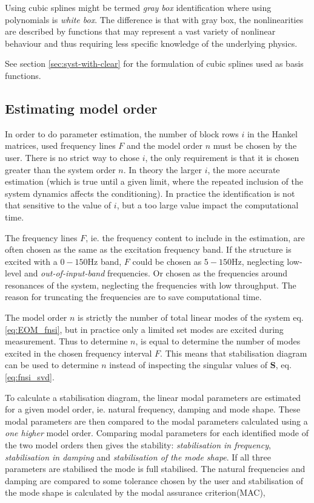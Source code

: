 Using cubic splines might be termed \textit{gray box} identification where using
polynomials is \textit{white box}. The difference is that with gray box, the
nonlinearities are described by functions that may represent a vast variety of
nonlinear behaviour and thus requiring less specific knowledge of the underlying
physics.

See section \ref{sec:syst-with-clear} for the formulation of cubic splines used
as basis functions.

\subsection{Estimating model order}

In order to do parameter estimation, the number of block rows $i$ in the Hankel
matrices, used frequency lines $F$ and the model order $n$ must be chosen by the
user.
There is no strict way to chose $i$, the only requirement is that it is chosen
greater than the system order $n$. In theory the larger $i$, the more accurate
estimation (which is true until a given limit, where the repeated inclusion of
the system dynamics affects the conditioning). In practice the identification is
not that sensitive to the value of $i$, but a too large value impact the
computational time.

The frequency lines $F$, ie. the frequency content to include in the estimation,
are often chosen as the same as the excitation frequency band. If the structure
is excited with a $0-150$Hz band, $F$ could be chosen as $5-150$Hz, neglecting
low-level and \textit{out-of-input-band} frequencies. Or chosen as the
frequencies around resonances of the system, neglecting the frequencies with low
throughput. The reason for truncating the frequencies are to save computational
time.

The model order $n$ is strictly the number of total linear modes of the system
eq. \eqref{eq:EOM_fnsi}, but in practice only a limited set modes are excited
during measurement. Thus to determine $n$, is equal to determine the number of
modes excited in the chosen frequency interval $F$.
This means that stabilisation diagram can be used to determine $n$ instead
of inspecting the singular values of $\bm S$, eq. \eqref{eq:fnsi_svd}.

To calculate a stabilisation diagram, the linear modal parameters are estimated
for a given model order, ie. natural frequency, damping and mode shape. These
modal parameters are then compared to the modal parameters calculated using a
\textit{one higher} model order.
Comparing modal parameters for each identified mode of the two model orders then
gives the stability: \textit{stabilisation in frequency}, \textit{stabilisation
  in damping} and \textit{stabilisation of the mode shape}. If all three
parameters are stabilised the mode is full stabilised. The natural frequencies
and damping are compared to some tolerance chosen by the user and stabilisation
of the mode shape is calculated by the modal assurance
criterion(MAC)\autocite{Allemang2003},

